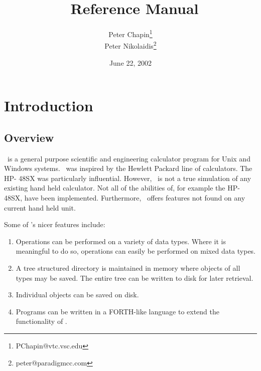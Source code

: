 \documentclass{report}
\begin{document}
\title{\CLAC\ Reference Manual}
\author{Peter Chapin\thanks{PChapin@vtc.vsc.edu}\\
        Peter Nikolaidis\thanks{peter@paradigmcc.com}}
\date{June 22, 2002}
\maketitle

\tableofcontents
\newpage
{}

\chapter{Introduction}

\section{Overview}

\CLAC\ is a general purpose scientific and engineering calculator program for Unix and Windows
systems. \CLAC\ was inspired by the Hewlett Packard line of calculators. The HP- 48SX was
particularly influential. However, \CLAC\ is not a true simulation of any existing hand held
calculator. Not all of the abilities of, for example the HP-48SX, have been implemented.
Furthermore, \CLAC\ offers features not found on any current hand held unit.

Some of \CLAC's nicer features include:

\begin{enumerate}
  
\item Operations can be performed on a variety of data types. Where it is meaningful to do so,
  operations can easily be performed on mixed data types.
  
\item A tree structured directory is maintained in memory where objects of all types may be
  saved. The entire tree can be written to disk for later retrieval.

\item Individual objects can be saved on disk.
  
\item Programs can be written in a FORTH-like language to extend the functionality of \CLAC.

\end{enumerate}
\end{document}
